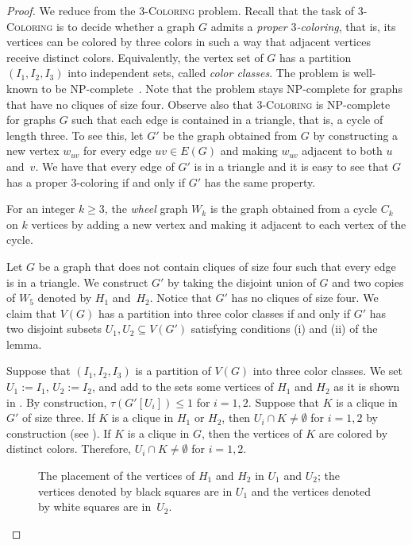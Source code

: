 \documentclass[11pt]{article}
\theoremstyle{definition}
\newcommand{\NP}{\textup{\textsf{NP}}}
\begin{document}
\begin{proof}
We reduce from the $3$-\textsc{Coloring} problem. Recall that the task of $3$-\textsc{Coloring} is to decide whether a graph $G$ admits a \emph{proper $3$-coloring}, that is, its vertices can be colored by three colors in such a way that adjacent vertices receive distinct colors. Equivalently,
the vertex set of $G$ has a partition $(I_1,I_2,I_3)$ into independent sets, called \emph{color classes}.
The problem is well-known to be \NP-complete~\cite{GareyJ79}. Note that the problem stays \NP-complete for graphs that
have no cliques of size four.
Observe also that $3$-\textsc{Coloring} is \NP-complete for graphs $G$ such that each edge is contained in a triangle, that is, a cycle of length three.
To see this, let $G'$ be the graph obtained from $G$ by constructing a new vertex $w_{uv}$ for every edge $uv\in E(G)$ and making $w_{uv}$ adjacent to both $u$ and~$v$. We have that every edge of $G'$ is in a triangle and it is easy to see that $G$ has a proper $3$-coloring if and only if $G'$ has the same property.

For an integer $k\geq 3$, the \emph{wheel} graph $W_k$ is the graph obtained from a cycle $C_k$ on $k$ vertices by adding a new vertex and making it adjacent to each vertex of the cycle.

Let $G$ be a graph that does not contain cliques of size four such that every edge is in a triangle. We construct $G'$ by taking the disjoint union of $G$ and two copies of $W_5$ denoted by $H_1$ and~$H_2$. Notice that $G'$ has no cliques of size four.
We claim that $V(G)$ has a partition into three color classes if and only if $G'$ has two disjoint subsets $U_1,U_2\subseteq V(G')$ satisfying conditions (i) and (ii) of the lemma.

Suppose that $(I_1,I_2,I_3)$ is a partition of $V(G)$ into three color classes. We set $U_1:=I_1$, $U_2:=I_2$, and add to the sets some vertices of $H_1$ and $H_2$ as it is shown in .
By construction, $\tau(G'[U_i])\leq 1$ for $i=1,2$.
Suppose that $K$ is a clique in $G'$ of size three.
If $K$ is a clique in $H_1$ or $H_2$, then $U_i\cap K\neq \emptyset$ for $i=1,2$ by construction (see ). If $K$ is a clique in $G$, then the vertices of $K$ are colored by distinct colors. Therefore, $U_i\cap K\neq \emptyset$ for $i=1,2$.

\begin{figure}[ht]
\centering
\scalebox{0.7}{

}
\caption{The placement of the vertices of $H_1$ and $H_2$ in $U_1$ and $U_2$; the vertices denoted by black squares are in $U_1$ and the vertices denoted by white squares are in~$U_2$.}\label{fig:H}
\end{figure}


\end{proof}
\end{document}
